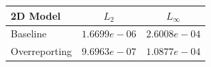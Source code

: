 \begin{table}[ht]
\centering
\begin{tabular}{lcc}
\hline
2D Model & $L_2$ & $L_\infty$ \\
\hline
Baseline & $1.6699e-06$ & $2.6008e-04$ \\
Overreporting & $9.6963e-07$ & $1.0877e-04$ \\
\hline
\end{tabular}
\end{table}
